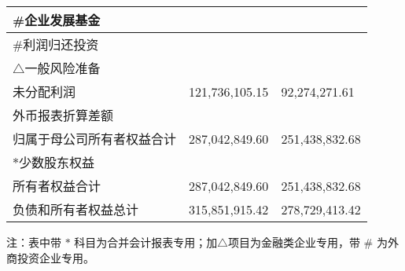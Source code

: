 {{\begin{center}
\begin{longtable}{|p{}<{\centering}|p{}|p{}|}
  \hline
  \#企业发展基金  & & \\
  \hline
  \#利润归还投资  & & \\
  \hline
  $\triangle$一般风险准备  & & \\
  \hline
  未分配利润  & 121,736,105.15& 92,274,271.61   \\
  \hline
  外币报表折算差额 &  &  \\
  \hline
归属于母公司所有者权益合计 & 287,042,849.60 &251,438,832.68  \\
  \hline
 $\ast$少数股东权益   & &\\
  \hline
所有者权益合计 & 287,042,849.60 &251,438,832.68  \\
  \hline
负债和所有者权益总计 & 315,851,915.42 &	 278,729,413.42  \\
  \hline
\end{longtable}
\end{center}
}}

注：表中带 $\ast$ 科目为合并会计报表专用；加$\triangle$项目为金融类企业专用，带 \# 为外商投资企业专用。


\clearpage
